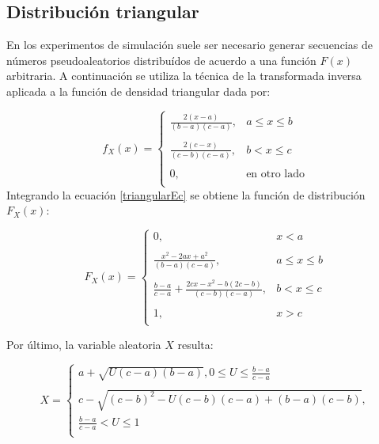 \documentclass{sig-alternate}
\begin{document}
\subsection{Distribuci\'on triangular}
\label{triangularSec}

En los experimentos de simulaci\'on suele ser necesario generar secuencias de n\'umeros pseudoaleatorios distribu\'idos de acuerdo a una funci\'on $F(x)$ arbitraria.
A continuaci\'on se utiliza la t\'ecnica de la transformada inversa aplicada a la funci\'on de densidad triangular dada por:

\begin{equation}
\label{triangularEc}
f_{X}(x) = 
    \begin{cases}
    \frac{2(x-a)}{(b-a)(c-a)}, &  a \le x \le b\\
     \ \\
    \frac{2(c-x)}{(c-b)(c-a)}, & b < x \le c\\
     \ \\
     0, & \text{en otro lado}\\
    \end{cases}
\end{equation}
Integrando la ecuaci\'{o}n \ref{triangularEc} se obtiene la funci\'on de  distribuci\'on $F_{X}(x)$:

\begin{equation}
\label{triangularIntegrada}
F_{X}(x) = 
    \begin{cases}
    0, & x < a\\
     \ \\
    \frac{x^{2} - 2ax + a^{2}}{(b-a)(c-a)}, &  a \le x \le b\\
     \ \\
    \frac{b-a}{c-a} + \frac{2cx - x^{2} - b(2c-b)}{(c-b)(c-a)}, & b < x \le c\\
     \ \\
     1, & x > c\\
    \end{cases}
\end{equation}

Por \'ultimo, la variable aleatoria $X$ resulta:

\begin{equation}
\label{vaconftriangular}
X = 
    \begin{cases}
    a + \sqrt{U(c-a)(b-a)}, 0 \leq U \leq \frac{b-a}{c-a} \\
    \ \\
    c - \sqrt{(c-b)^{2} - U(c-b)(c-a) + (b-a)(c-b)}, \\ \frac{b-a}{c-a} < U \leq 1 \\
    \end{cases}
\end{equation}
\end{document}
